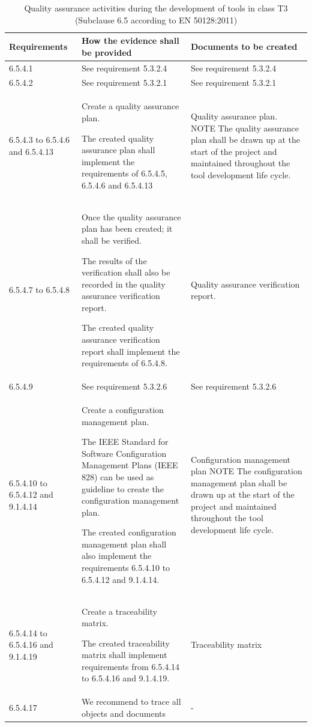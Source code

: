 \documentclass{template/openetcs_report}
\begin{document}
{\footnotesize\sffamily\centering
\begin{longtable}{|p{2cm}|p{9cm}|p{3cm}|}
\caption{Quality assurance activities during the development of tools in class T3 (Subclause 6.5 according to EN 50128:2011)}\\
\hline
\bfseries Requirements & \bfseries How the evidence shall be provided & \bfseries Documents to be created\\
\hline
\hline
\endhead
\hline
\endfoot

6.5.4.1 & See requirement 5.3.2.4 & See requirement 5.3.2.4\\ 
\hline
6.5.4.2 & See requirement 5.3.2.1 & See requirement 5.3.2.1\\ 
\hline
6.5.4.3 to 6.5.4.6 and 6.5.4.13 & Create a quality assurance plan.

The created quality assurance plan shall implement the requirements of 6.5.4.5, 6.5.4.6 and 6.5.4.13
& Quality assurance plan.
\linebreak
\linebreak
NOTE\linebreak
The quality assurance plan shall be drawn up at the start of the project and maintained throughout the tool development life cycle.\\ 
\hline
6.5.4.7 to 6.5.4.8 & Once the quality assurance plan has been created; it shall be verified.

The results of the verification shall also be recorded in the quality assurance verification report.

The created quality assurance verification report shall implement the requirements of 6.5.4.8.
& Quality assurance verification report.\\ 
\hline
6.5.4.9 & See requirement 5.3.2.6 & See requirement 5.3.2.6\\ 
\hline
6.5.4.10 to 6.5.4.12 and 9.1.4.14 & Create a configuration management plan.

The IEEE Standard for Software Configuration Management Plans (IEEE 828) can be used as guideline to create the configuration management plan.

The created configuration management plan shall also implement the requirements 6.5.4.10 to 6.5.4.12 and 9.1.4.14.
& Configuration management plan
\linebreak
\linebreak
NOTE\linebreak
The configuration management plan shall be drawn up at the start of the project and maintained throughout the tool development life cycle.\\ 
\hline
6.5.4.14 to 6.5.4.16 and 9.1.4.19 & Create a traceability matrix.

The created traceability matrix shall implement requirements from 6.5.4.14 to 6.5.4.16 and 9.1.4.19.
& Traceability matrix\\ 
\hline
6.5.4.17 & We recommend to trace all objects and documents & - \\ 
\hline
\end{longtable}}
\end{document}

